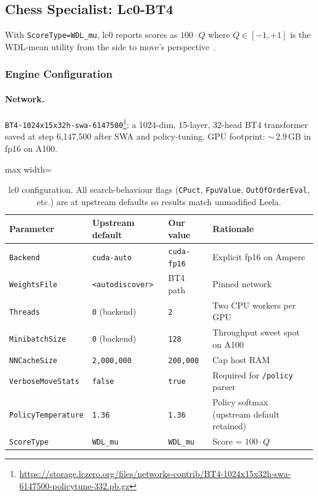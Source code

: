 \subsection{Chess Specialist: Lc0-BT4}
\label{sec:app_lc0}

With \texttt{ScoreType=WDL\_mu}, lc0 reports scores as $100\!\cdot\!Q$ where
$Q\in[-1,+1]$ is the WDL-mean utility from the side to move's perspective~\cite{monroe2024mastering}.

\subsubsection{Engine Configuration}
\label{sec:app_lc0_config}
\label{sec:app_lc0_latent}

\paragraph{Network.}
\texttt{BT4-1024x15x32h-swa-6147500}\footnote{\url{https://storage.lczero.org/files/networks-contrib/BT4-1024x15x32h-swa-6147500-policytune-332.pb.gz}}:
a 1024-dim, 15-layer, 32-head BT4 transformer saved at step 6{,}147{,}500 after SWA and policy-tuning.
GPU footprint: ${\sim}\,2.9$\,GB in fp16 on A100.

\begin{table}[h]
\centering
\small
\begin{adjustbox}{max width=\textwidth}
\begin{tabular}{llll}
\toprule
\textbf{Parameter} & \textbf{Upstream default} & \textbf{Our value} & \textbf{Rationale} \\
\midrule
\texttt{Backend}          & \texttt{cuda-auto}      & \texttt{cuda-fp16}  & Explicit fp16 on Ampere \\
\texttt{WeightsFile}      & \texttt{<autodiscover>} & BT4 path            & Pinned network \\
\texttt{Threads}          & \texttt{0} (backend)    & \texttt{2}          & Two CPU workers per GPU \\
\texttt{MinibatchSize}    & \texttt{0} (backend)    & \texttt{128}        & Throughput sweet spot on A100 \\
\texttt{NNCacheSize}      & \texttt{2{,}000{,}000}  & \texttt{200{,}000}  & Cap host RAM \\
\texttt{VerboseMoveStats} & \texttt{false}          & \texttt{true}       & Required for \texttt{/policy} parser \\
\texttt{PolicyTemperature}& \texttt{1.36}           & \texttt{1.36}       & Policy softmax (upstream default retained) \\
\texttt{ScoreType}        & \texttt{WDL\_mu}        & \texttt{WDL\_mu}    & Score = $100\!\cdot\!Q$ \\
\bottomrule
\end{tabular}
\end{adjustbox}
\vspace{2mm}\caption{lc0 configuration. All search-behaviour flags (\texttt{CPuct}, \texttt{FpuValue},
\texttt{OutOfOrderEval}, etc.) are at upstream defaults so results match unmodified Leela.}
\label{tab:lc0-flags}
\end{table}

